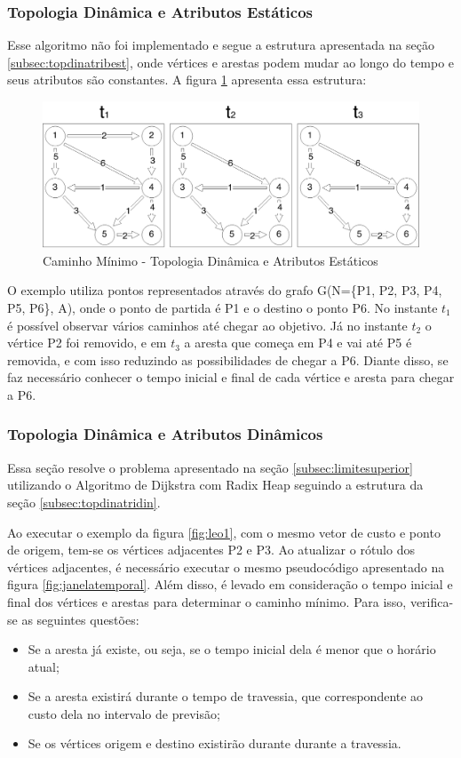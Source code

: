 \subsubsection{Topologia Dinâmica e Atributos Estáticos}
Esse algoritmo não foi implementado e segue a estrutura apresentada na seção \ref{subsec:topdinatribest},
onde vértices e arestas podem mudar ao longo do tempo e seus atributos são constantes. A 
figura \ref{fig:pathtopdyn} apresenta essa estrutura:

\begin{figure}[htbp]
\centering
 \includegraphics[width=.80\textwidth]{chapters/fig/pathtopdyn.png}
\caption{Caminho Mínimo - Topologia Dinâmica e Atributos Estáticos}
\label{fig:pathtopdyn}
\end{figure}
\FloatBarrier
O exemplo utiliza pontos representados através do grafo G(N=\{P1, P2, P3, P4, P5, P6\}, A), onde o 
ponto de partida é P1 e o destino o ponto P6. No instante $t_1$ é possível observar vários caminhos
até chegar ao objetivo. Já no instante $t_2$ o vértice P2 foi removido, e em $t_3$ a aresta que começa em
P4 e vai até P5 é removida, e com isso reduzindo as possibilidades de chegar a P6. Diante disso,
se faz necessário conhecer o tempo inicial e final de cada vértice e aresta para chegar a P6.

\subsubsection{Topologia Dinâmica e Atributos Dinâmicos}
Essa seção resolve o problema apresentado na seção \ref{subsec:limitesuperior} utilizando o Algoritmo de
Dijkstra com Radix Heap seguindo a estrutura da seção \ref{subsec:topdinatridin}.

Ao executar o exemplo da figura \ref{fig:leo1}, com o mesmo vetor de custo e ponto de origem, tem-se
os vértices adjacentes P2 e P3. Ao atualizar o rótulo dos vértices adjacentes, é necessário executar o mesmo
pseudocódigo apresentado na figura \ref{fig:janelatemporal}. Além disso, é levado em consideração o tempo
inicial e final dos vértices e arestas para determinar o caminho mínimo. Para isso,
verifica-se as seguintes questões:
\begin{itemize}
\item Se a aresta já existe, ou seja, se o tempo inicial dela é menor que o horário atual;
\item Se a aresta existirá durante o tempo de travessia, que correspondente ao custo dela no intervalo de previsão;
\item Se os vértices origem e destino existirão durante durante a travessia.
\end{itemize}
\FloatBarrier

